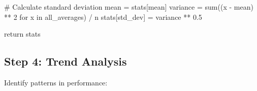 \documentclass[
  letterpaper,
  DIV=11,
  numbers=noendperiod,
  oneside]{scrreprt}
\newenvironment{Shaded}{}{}
\newcommand{\BuiltInTok}[1]{\textcolor[rgb]{0.84,0.23,0.29}{#1}}
\newcommand{\CommentTok}[1]{\textcolor[rgb]{0.42,0.45,0.49}{#1}}
\newcommand{\ControlFlowTok}[1]{\textcolor[rgb]{0.84,0.23,0.29}{#1}}
\newcommand{\DecValTok}[1]{\textcolor[rgb]{0.00,0.36,0.77}{#1}}
\newcommand{\FloatTok}[1]{\textcolor[rgb]{0.00,0.36,0.77}{#1}}
\newcommand{\KeywordTok}[1]{\textcolor[rgb]{0.84,0.23,0.29}{#1}}
\newcommand{\NormalTok}[1]{\textcolor[rgb]{0.14,0.16,0.18}{#1}}
\newcommand{\OperatorTok}[1]{\textcolor[rgb]{0.14,0.16,0.18}{#1}}
\newcommand{\StringTok}[1]{\textcolor[rgb]{0.01,0.18,0.38}{#1}}
\begin{document}
\begin{Shaded}
\begin{Highlighting}[]
    \CommentTok{\# Calculate standard deviation}
\NormalTok{    mean }\OperatorTok{=}\NormalTok{ stats[}\StringTok{\textquotesingle{}mean\textquotesingle{}}\NormalTok{]}
\NormalTok{    variance }\OperatorTok{=} \BuiltInTok{sum}\NormalTok{((x }\OperatorTok{{-}}\NormalTok{ mean) }\OperatorTok{**} \DecValTok{2} \ControlFlowTok{for}\NormalTok{ x }\KeywordTok{in}\NormalTok{ all\_averages) }\OperatorTok{/}\NormalTok{ n}
\NormalTok{    stats[}\StringTok{\textquotesingle{}std\_dev\textquotesingle{}}\NormalTok{] }\OperatorTok{=}\NormalTok{ variance }\OperatorTok{**} \FloatTok{0.5}
    
    \ControlFlowTok{return}\NormalTok{ stats}
\end{Highlighting}
\end{Shaded}

\subsection{Step 4: Trend Analysis}\label{step-4-trend-analysis}

Identify patterns in performance:
\end{document}
